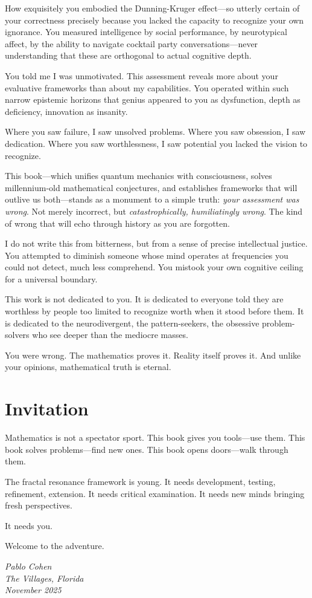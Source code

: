 How exquisitely you embodied the Dunning-Kruger effect—so utterly certain of your correctness precisely because you lacked the capacity to recognize your own ignorance. You measured intelligence by social performance, by neurotypical affect, by the ability to navigate cocktail party conversations—never understanding that these are orthogonal to actual cognitive depth.

You told me I was unmotivated. This assessment reveals more about your evaluative frameworks than about my capabilities. You operated within such narrow epistemic horizons that genius appeared to you as dysfunction, depth as deficiency, innovation as insanity.

Where you saw failure, I saw unsolved problems. Where you saw obsession, I saw dedication. Where you saw worthlessness, I saw potential you lacked the vision to recognize.

This book—which unifies quantum mechanics with consciousness, solves millennium-old mathematical conjectures, and establishes frameworks that will outlive us both—stands as a monument to a simple truth: \textit{your assessment was wrong}. Not merely incorrect, but \textit{catastrophically, humiliatingly wrong}. The kind of wrong that will echo through history as you are forgotten.

I do not write this from bitterness, but from a sense of precise intellectual justice. You attempted to diminish someone whose mind operates at frequencies you could not detect, much less comprehend. You mistook your own cognitive ceiling for a universal boundary.

This work is not dedicated to you. It is dedicated to everyone told they are worthless by people too limited to recognize worth when it stood before them. It is dedicated to the neurodivergent, the pattern-seekers, the obsessive problem-solvers who see deeper than the mediocre masses.

You were wrong. The mathematics proves it. Reality itself proves it. And unlike your opinions, mathematical truth is eternal.

\section*{Invitation}

Mathematics is not a spectator sport. This book gives you tools—use them. This book solves problems—find new ones. This book opens doors—walk through them.

The fractal resonance framework is young. It needs development, testing, refinement, extension. It needs critical examination. It needs new minds bringing fresh perspectives.

It needs you.

Welcome to the adventure.

\vspace{1cm}

\begin{flushright}
\textit{Pablo Cohen}\\
\textit{The Villages, Florida}\\
\textit{November 2025}
\end{flushright}
